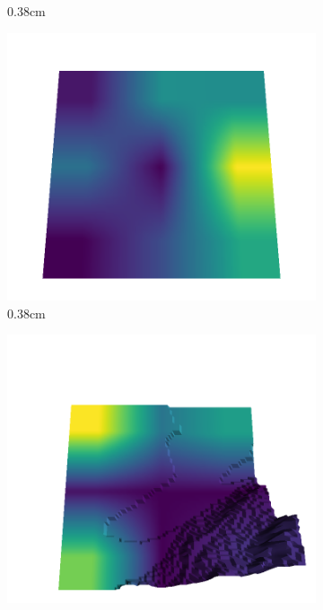 \documentclass[../document.tex]{subfiles}
\begin{document}
\begin{figure}[H]
\begin{subfigure}[b]{0.242\linewidth}
    \caption{0.38cm}
    \end{subfigure}
    \begin{subfigure}[b]{0.242\linewidth}
    \includegraphics[width=\linewidth]{../img/5/quarry/best/62-patch-3d-majavi-colormap-70.png}
    \caption{0.38cm}
    \end{subfigure}
    \begin{subfigure}[b]{0.242\linewidth}
    \includegraphics[width=\linewidth]{../img/5/quarry/best/63-patch-3d-majavi-colormap-75.png}

\end{subfigure}
\end{figure}
\end{document}
